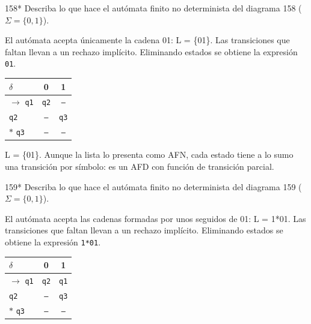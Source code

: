 \documentclass[11pt]{article}
\begin{document}


\begin{ejercicio}{158}{*}
Describa lo que hace el autómata finito no determinista del diagrama 158 ($\Sigma = \{0, 1\}$).
\end{ejercicio}
\proc El autómata acepta únicamente la cadena 01: L = \{01\}. Las transiciones que faltan llevan a un rechazo implícito. Eliminando estados se obtiene la expresión \texttt{01}.
\begin{center}\small\begin{tabular}{lcc}\toprule
$\delta$ & 0 & 1 \\\midrule
$\to$ \texttt{q1} & \texttt{q2} & \texttt{--} \\
 \texttt{q2} & \texttt{--} & \texttt{q3} \\
$*$ \texttt{q3} & \texttt{--} & \texttt{--} \\
\bottomrule\end{tabular}\end{center}

\resp L = \{01\}. Aunque la lista lo presenta como AFN, cada estado tiene a lo sumo una transición por símbolo: es un AFD con función de transición parcial.


\begin{ejercicio}{159}{*}
Describa lo que hace el autómata finito no determinista del diagrama 159 ($\Sigma = \{0, 1\}$).
\end{ejercicio}
\proc El autómata acepta las cadenas formadas por unos seguidos de 01: L = 1*01. Las transiciones que faltan llevan a un rechazo implícito. Eliminando estados se obtiene la expresión \texttt{1*01}.
\begin{center}\small\begin{tabular}{lcc}\toprule
$\delta$ & 0 & 1 \\\midrule
$\to$ \texttt{q1} & \texttt{q2} & \texttt{q1} \\
 \texttt{q2} & \texttt{--} & \texttt{q3} \\
$*$ \texttt{q3} & \texttt{--} & \texttt{--} \\
\bottomrule\end{tabular}\end{center}
\end{document}
